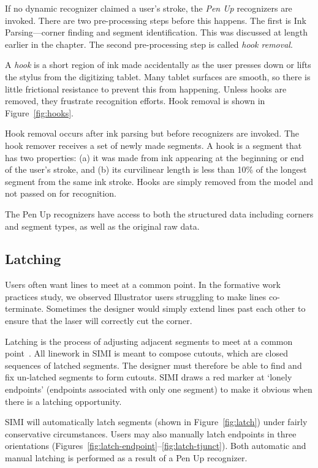 If no dynamic recognizer claimed a user's stroke, the \textit{Pen Up}
recognizers are invoked. There are two pre-processing steps before
this happens. The first is Ink Parsing---corner finding and segment
identification. This was discussed at length earlier in the
chapter. The second pre-processing step is called \textit{hook
  removal}.

A \textit{hook} is a short region of ink made accidentally as the user
presses down or lifts the stylus from the digitizing tablet. Many
tablet surfaces are smooth, so there is little frictional resistance
to prevent this from happening. Unless hooks are removed, they
frustrate recognition efforts. Hook removal is shown in
Figure~\ref{fig:hooks}.



Hook removal occurs after ink parsing but before recognizers are
invoked. The hook remover receives a set of newly made segments. A
hook is a segment that has two properties: (a) it was made from ink
appearing at the beginning or end of the user's stroke, and (b) its
curvilinear length is less than 10\% of the longest segment from the
same ink stroke. Hooks are simply removed from the model and not
passed on for recognition.

The Pen Up recognizers have access to both the structured data
including corners and segment types, as well as the original raw data.

\subsection{Latching}



Users often want lines to meet at a common point. In the formative
work practices study, we observed Illustrator users struggling to make
lines co-terminate. Sometimes the designer would simply extend lines
past each other to ensure that the laser will correctly cut the
corner.

Latching is the process of adjusting adjacent segments to meet at a
common point~\cite{herot-latch-corners}. All linework in SIMI is meant
to compose cutouts, which are closed sequences of latched
segments. The designer must therefore be able to find and fix
un-latched segments to form cutouts. SIMI draws a red marker at
`lonely endpoints' (endpoints associated with only one segment) to
make it obvious when there is a latching opportunity.

SIMI will automatically latch segments (shown in
Figure~\ref{fig:latch}) under fairly conservative circumstances. Users
may also manually latch endpoints in three orientations
(Figures~\ref{fig:latch-endpoint}--\ref{fig:latch-tjunct}). Both
automatic and manual latching is performed as a result of a Pen Up
recognizer.

